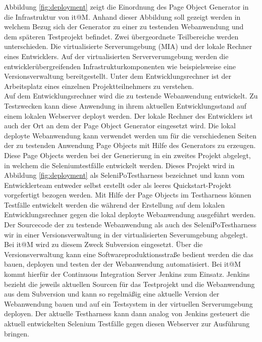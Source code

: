 Abbildung \ref{fig:deployment} zeigt die Einordnung des Page Object Generator in die Infrastruktur von it@M. Anhand dieser Abbildung soll gezeigt werden in welchem Bezug sich der Generator zu einer zu testenden Webanwendung und dem späteren Testprojekt befindet.
Zwei übergeordnete Teilbereiche werden unterschieden. Die virtualisierte Serverumgebung (MIA) und der lokale Rechner eines Entwicklers. Auf der virtualisierten Serververumgebung werden die entwicklerübergreifenden Infrastrukturkomponenten wie beispielsweise eine Versionsverwaltung bereitgestellt. Unter dem Entwicklungsrechner ist der Arbeitsplatz eines einzelnen Projektteilnehmers zu verstehen.\\
Auf dem Entwicklungsrechner wird die zu testende Webanwendung entwickelt. Zu Testzwecken kann diese Anwendung in ihrem aktuellen Entwicklungsstand auf einem lokalen Webserver deployt werden.
Der lokale Rechner des Entwicklers ist auch der Ort an dem der Page Object Generator eingesetzt wird. Die lokal deployte Webanwendung kann verwendet werden um für die verschiedenen Seiten der zu testenden Anwendung Page Objects mit Hilfe des Generators zu erzeugen. Diese Page Objects werden bei der Generierung in ein zweites Projekt abgelegt, in welchem die Seleniumtestfälle entwickelt werden. Dieses Projekt wird in Abbildung \ref{fig:deployment} als SeleniPoTestharness bezeichnet und kann vom Entwicklerteam entweder selbst erstellt oder als leeres Quickstart-Projekt vorgefertigt bezogen werden. Mit Hilfe der Page Objects im Testharness können Testfälle entwickelt werden die während der Erstellung auf dem lokalen Entwicklungsrechner gegen die lokal deployte Webanwendung ausgeführt werden.
Der Sourcecode der zu testende Webanwendung als auch des SeleniPoTestharness wir in einer Versionsverwaltung in der virtualisierten Severumgebung abgelegt. Bei it@M wird zu diesem Zweck Subversion eingesetzt. Über die Versionsverwaltung kann eine Softwareproduktionsstraße bedient werden die das bauen, deployen und testen der der Webanwendung automatisiert. Bei it@M kommt hierfür der Continuous Integration Server Jenkins zum Einsatz. Jenkins bezieht die jeweils aktuellen Sourcen für das Testprojekt und die Webanwendung aus dem Subversion und kann so regelmäßig eine aktuelle Version der Webanwendung bauen und auf ein Testsystem in der virtuellen Serverumgebung deployen. Der aktuelle Testharness kann dann analog von Jenkins gesteuert die aktuell entwickelten Selenium Testfälle gegen diesen Webserver zur Ausführung bringen.



